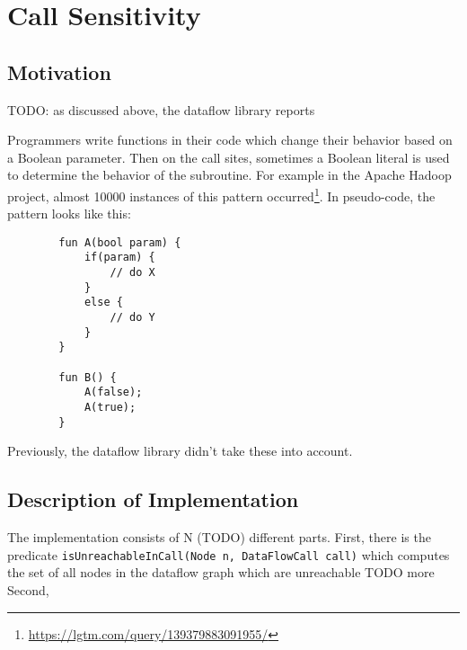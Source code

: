 






\newpage
\section{Call Sensitivity}
\subsection{Motivation}
TODO: as discussed above, the dataflow library reports 

Programmers write functions in their code which change their behavior based on 
a Boolean parameter.
Then on the call sites, sometimes a Boolean literal is used to determine the behavior
of the subroutine.
For example in the Apache Hadoop project, almost 10000 instances of this
pattern occurred\footnote{\url{https://lgtm.com/query/139379883091955/}}.
In pseudo-code, the pattern looks like this:
\begin{verbatim}
        fun A(bool param) {
            if(param) {
                // do X
            }
            else {
                // do Y
            }
        }

        fun B() {
            A(false);
            A(true);
        }
\end{verbatim}
Previously, the dataflow library didn't take these into account.


\subsection{Description of Implementation}
The implementation consists of N (TODO) different parts.
First, there is the predicate \texttt{isUnreachableInCall(Node n, DataFlowCall call)} which
computes the set of all nodes in the dataflow graph which are unreachable
TODO more
Second, 

